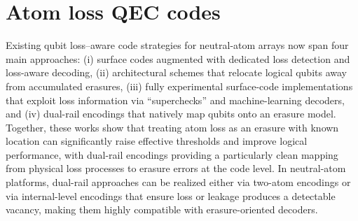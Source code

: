 \documentclass{article}
\begin{document}



\section{Atom loss QEC codes} 
Existing qubit loss–aware code strategies for neutral-atom arrays now span four main approaches: 
(i) surface codes augmented with dedicated loss detection and loss-aware decoding, 
(ii) architectural schemes that relocate logical qubits away from accumulated erasures, 
(iii) fully experimental surface-code implementations that exploit loss information via “superchecks” and machine-learning decoders, and 
(iv) dual-rail encodings that natively map qubits onto an erasure model. 
Together, these works show that treating atom loss as an erasure with known location can significantly raise effective thresholds and improve logical performance, with dual-rail encodings providing a particularly clean mapping from physical loss processes to erasure errors at the code level. 
In neutral-atom platforms, dual-rail approaches can be realized either via two-atom encodings or via internal-level encodings that ensure loss or leakage produces a detectable vacancy, making them highly compatible with erasure-oriented decoders.\\
\end{document}
